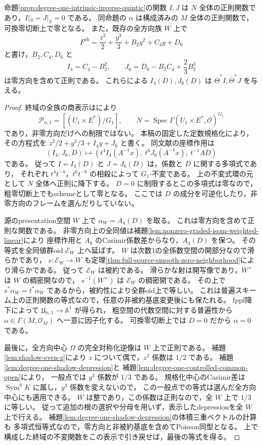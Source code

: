 \begin{lemma}[最高活性係数の零方向への正則延長]
\label{lem:degree-one-regular-invariants-zero}
命題\ref{prop:degree-one-intrinsic-inverse-quintic}の関数 $I,J$ は
$N$ 全体の正則関数であり，$I|_S=J|_S=0$ である。
同命題の $\alpha$ は構成済みの $M$ 全体の正則関数で，
可換零切断上で零となる。
また，既存の全方向族 $W$ 上で
\[
 F^{\mathrm{sh}}=\frac{z^2}{2}+\frac{y^3}{3}
                      +B_2y^2+C_4y+D_6
\]
と書け，$B_2,C_4,D_6$ と
\[
 I_4=C_4-B_2^2,\qquad
 J_6=D_6-B_2C_4+\frac23B_2^3
\]
は零方向を含めて正則である。
これらによる $I_4(D),J_6(D)$ は $\overline\Theta^*I,\overline\Theta^*J$ を与える。
\end{lemma}
\begin{proof}
終域の全族の商表示は\cite[定理8.8，9.2]{PoissonDP}により
\[
 \mathcal P_{n,1}=[(U_1\times E^*)/G_1],\qquad
 N=\operatorname{Spec}\Gamma(U_1\times E^*,\mathcal O)^{G_1}
\]
であり，非零方向だけへの制限ではない。
本稿の固定した定数規格化により，その方程式を
$z^2/2+y^3/3+I_4y+J_6$ と書く。
同文献の座標作用は
\[
 (I_4,J_6,D)\longmapsto
 (t^4I_4(A^{-1}x),\ t^6J_6(A^{-1}x),\ t^{-1}AD)
\]
である。
従って $I=I_4(D)$ と $J=J_6(D)$ は，係数と $D$ に関する多項式であり，
それぞれ $t^4t^{-4}$，$t^6t^{-6}$ の相殺によって $G_1$-不変である。
上の不変式環の元として $N$ 全体へ正則に降下する。
$D=0$ に制限するとこの多項式は零なので，粗零切断上でもschemeとして零となる。
ここでは $D$ の成分を可逆化したり，非零方向のフレームを選んだりしていない。

源のpresentation空間 $W$ 上で $\alpha_W=A_4(D)$ を取る。
これは零方向を含めて正則な関数である。
非零方向上の全同値は補題\ref{lem:nonzero-graded-isom-weighted-linear}により
座標作用と $A_6$ のCasimir係数差からなり，$A_4(D)$ を保つ。
その等式を全同値群oid $\mathcal E_W$ 上へ延ばす。
$W$ は次数1の全係数空間の開部分なので滑らかであり，
$s:\mathcal E_W\to W$ も定理\ref{thm:full-source-smooth-zero-neighborhood}により滑らかである。
従って $\mathcal E_W$ は被約である。
滑らかな射は開写像であり，$W^\times$ は $W$ の稠密開なので，
$s^{-1}(W^\times)$ は $\mathcal E_W$ の稠密開である。
その上で $s^*\alpha_W=t^*\alpha_W$ であるから，被約性により全群oid上で等しい。
これは普遍スキーム上の正則関数の等式なので，任意の非被約基底変更後にも保たれる。
fppf降下によって $\mathfrak U_{n,1}\to\mathbb A^1$ が得られ，
粗空間の代数空間に対する普遍性から $\alpha\in\Gamma(M,\mathcal O_M)$ へ一意に因子化する。
可換零切断上では $D=0$ だから $\alpha=0$ である。

最後に，全方向中心 $\Omega$ の完全対称化逆像は $W$ 上で正則である。
補題\ref{lem:shadow-even-z}により $z$ について偶で，$z^2$ 係数は $1/2$ である。
補題\ref{lem:degree-one-shadow-depression}と
補題\ref{lem:degree-one-controlled-common-open}により，
一般点では $y^3$ 係数が $1/3$ である。
規格化中心のCasimir差は $\operatorname{Sym}^6K$ に属し，$y^3$ 係数を変えないので，
この一般点での等式は選んだ全方向中心にも適用できる。
$W$ は整であり，この係数は正則なので，全 $W$ 上で $1/3$ に等しい。
従って追加の根の選択や分母を用いず，表示したdepressionを全 $W$ 上で行える。
補題\ref{lem:degree-one-shadow-depression}の体積三重ベクトルの計算も
多項式恒等式なので，零方向と非被約基底を含めてPoisson同型となる。
上で構成した終域の不変関数をこの表示で引き戻せば，最後の等式を得る。
\end{proof}

